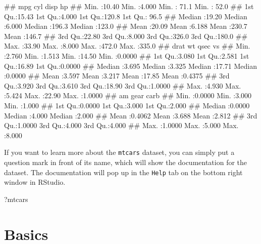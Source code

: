 \documentclass[
]{book}
\newenvironment{Shaded}{\begin{snugshade}}{\end{snugshade}}
\newcommand{\NormalTok}[1]{#1}
\begin{document}
\begin{Shaded}
\begin{Highlighting}[]
\NormalTok{\#\#       mpg             cyl             disp             hp       }
\NormalTok{\#\#  Min.   :10.40   Min.   :4.000   Min.   : 71.1   Min.   : 52.0  }
\NormalTok{\#\#  1st Qu.:15.43   1st Qu.:4.000   1st Qu.:120.8   1st Qu.: 96.5  }
\NormalTok{\#\#  Median :19.20   Median :6.000   Median :196.3   Median :123.0  }
\NormalTok{\#\#  Mean   :20.09   Mean   :6.188   Mean   :230.7   Mean   :146.7  }
\NormalTok{\#\#  3rd Qu.:22.80   3rd Qu.:8.000   3rd Qu.:326.0   3rd Qu.:180.0  }
\NormalTok{\#\#  Max.   :33.90   Max.   :8.000   Max.   :472.0   Max.   :335.0  }
\NormalTok{\#\#       drat             wt             qsec             vs        }
\NormalTok{\#\#  Min.   :2.760   Min.   :1.513   Min.   :14.50   Min.   :0.0000  }
\NormalTok{\#\#  1st Qu.:3.080   1st Qu.:2.581   1st Qu.:16.89   1st Qu.:0.0000  }
\NormalTok{\#\#  Median :3.695   Median :3.325   Median :17.71   Median :0.0000  }
\NormalTok{\#\#  Mean   :3.597   Mean   :3.217   Mean   :17.85   Mean   :0.4375  }
\NormalTok{\#\#  3rd Qu.:3.920   3rd Qu.:3.610   3rd Qu.:18.90   3rd Qu.:1.0000  }
\NormalTok{\#\#  Max.   :4.930   Max.   :5.424   Max.   :22.90   Max.   :1.0000  }
\NormalTok{\#\#        am              gear            carb      }
\NormalTok{\#\#  Min.   :0.0000   Min.   :3.000   Min.   :1.000  }
\NormalTok{\#\#  1st Qu.:0.0000   1st Qu.:3.000   1st Qu.:2.000  }
\NormalTok{\#\#  Median :0.0000   Median :4.000   Median :2.000  }
\NormalTok{\#\#  Mean   :0.4062   Mean   :3.688   Mean   :2.812  }
\NormalTok{\#\#  3rd Qu.:1.0000   3rd Qu.:4.000   3rd Qu.:4.000  }
\NormalTok{\#\#  Max.   :1.0000   Max.   :5.000   Max.   :8.000}
\end{Highlighting}
\end{Shaded}

\hfill\break
If you want to learn more about the \texttt{mtcars} dataset, you can simply put a question mark in front of its name, which will show the documentation for the dataset. The documentation will pop up in the \texttt{Help} tab on the bottom right window in RStudio.

\begin{Shaded}
\begin{Highlighting}[]
\NormalTok{?mtcars}
\end{Highlighting}
\end{Shaded}

\hypertarget{basics}{%
\chapter{Basics}\label{basics}}
\end{document}
